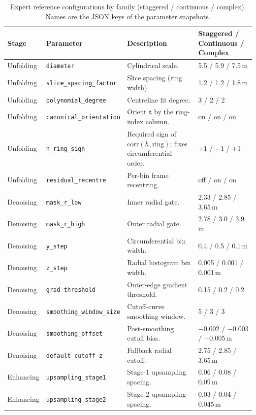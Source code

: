 \documentclass[a4paper,fleqn]{cas-dc}
\begin{document}
\begin{table}[t]
\caption{Expert reference configurations by family (staggered / continuous / complex). Names are the JSON keys of the parameter snapshots.}\label{tab:anchor-params}
\footnotesize
\setlength{\tabcolsep}{3pt}
\begin{tabular*}{\textwidth}{@{\extracolsep{\fill}} l l Y{0.30\textwidth} l @{}}
\toprule
Stage & Parameter & Description & Staggered / Continuous / Complex \\
\midrule
Unfolding & \texttt{diameter} & Cylindrical scale. & 5.5 / 5.9 / 7.5\,m \\
Unfolding & \texttt{slice\_spacing\_factor} & Slice spacing (ring width). & 1.2 / 1.2 / 1.8\,m \\
Unfolding & \texttt{polynomial\_degree} & Centreline fit degree. & 3 / 2 / 2 \\
Unfolding & \texttt{canonical\_orientation} & Orient $\mathbf t$ by the ring-index column. & on / on / on \\
Unfolding & \texttt{h\_ring\_sign} & Required sign of $\mathrm{corr}(h,\text{ring})$; fixes circumferential order. & $+1$ / $-1$ / $+1$ \\
Unfolding & \texttt{residual\_recentre} & Per-bin frame recentring. & off / on / on \\
\midrule
Denoising & \texttt{mask\_r\_low} & Inner radial gate. & 2.33 / 2.85 / 3.65\,m \\
Denoising & \texttt{mask\_r\_high} & Outer radial gate. & 2.78 / 3.0 / 3.9\,m \\
Denoising & \texttt{y\_step} & Circumferential bin width. & 0.4 / 0.5 / 0.1\,m \\
Denoising & \texttt{z\_step} & Radial histogram bin width. & 0.005 / 0.001 / 0.001\,m \\
Denoising & \texttt{grad\_threshold} & Outer-edge gradient threshold. & 0.15 / 0.2 / 0.2 \\
Denoising & \texttt{smoothing\_window\_size} & Cutoff-curve smoothing window. & 5 / 3 / 3 \\
Denoising & \texttt{smoothing\_offset} & Post-smoothing cutoff bias. & $-$0.002 / $-$0.003 / $-$0.005\,m \\
Denoising & \texttt{default\_cutoff\_z} & Fallback radial cutoff. & 2.75 / 2.85 / 3.65\,m \\
\midrule
Enhancing & \texttt{upsampling\_stage1} & Stage-1 upsampling spacing. & 0.06 / 0.08 / 0.09\,m \\
Enhancing & \texttt{upsampling\_stage2} & Stage-2 upsampling spacing. & 0.03 / 0.04 / 0.045\,m \\

\end{tabular*}
\end{table}
\end{document}

